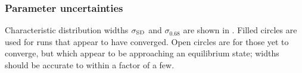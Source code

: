 \subsubsection{Parameter uncertainties}

Characteristic distribution widths $\sigma_\mathrm{SD}$ and $\sigma_{0.68}$ are shown in . Filled circles are used for runs that appear to have converged. Open circles are for those yet to converge, but which appear to be approaching an equilibrium state; widths should be accurate to within a factor of a few.
\begin{figure}%
\centering
{} \quad
{} \\
 \quad
{} \\

\end{figure}
